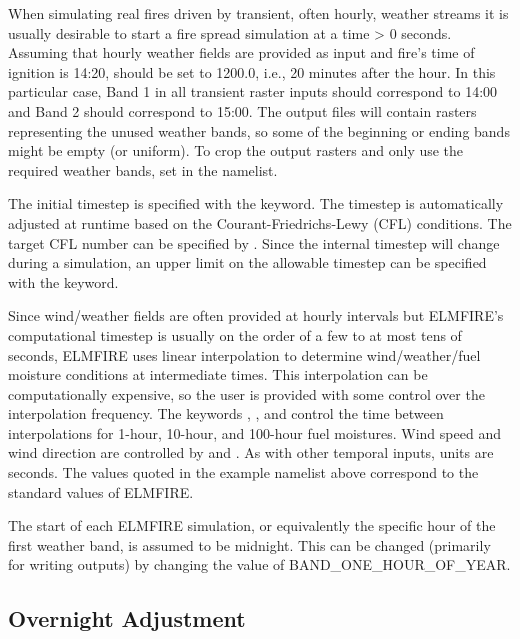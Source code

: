 When simulating real fires driven by transient, often hourly, weather streams it is usually desirable to start a fire spread simulation at a time > 0 seconds. Assuming that hourly weather fields are provided as input and fire’s time of ignition is 14:20,  should be set to 1200.0, i.e., 20 minutes after the hour. In this particular case, Band 1 in all transient raster inputs should correspond to 14:00 and Band 2 should correspond to 15:00. The output files will contain rasters representing the unused weather bands, so some of the beginning or ending bands might be empty (or uniform). To crop the output rasters and only use the required weather bands, set  in the  namelist.

The initial timestep is specified with the  keyword. The timestep is automatically adjusted at runtime based on the Courant-Friedrichs-Lewy (CFL) conditions. The target CFL number can be specified by . Since the internal timestep will change during a simulation, an upper limit on the allowable timestep can be specified with the  keyword.

Since wind/weather fields are often provided at hourly intervals but ELMFIRE’s computational timestep is usually on the order of a few to at most tens of seconds, ELMFIRE uses linear interpolation to determine wind/weather/fuel moisture conditions at intermediate times. This interpolation can be computationally expensive, so the user is provided with some control over the interpolation frequency. The keywords , , and  control the time between interpolations for 1-hour, 10-hour, and 100-hour fuel moistures. Wind speed and wind direction are controlled by  and . As with other temporal inputs, units are seconds. The values quoted in the example  namelist above correspond to the standard values of ELMFIRE.

The start of each ELMFIRE simulation, or equivalently the specific hour of the first weather band, is assumed to be midnight. This can be changed (primarily for writing outputs) by changing the value of BAND\_ONE\_HOUR\_OF\_YEAR.

\subsection{Overnight Adjustment}
\label{overnight_adjustment}

